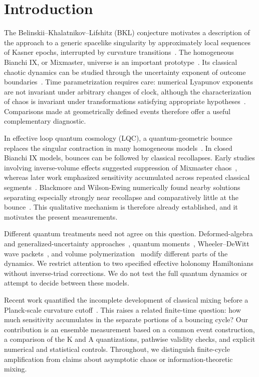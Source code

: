 \documentclass[12pt]{iopjournal}
\begin{document}
\section{Introduction}
The Belinskii--Khalatnikov--Lifshitz (BKL) conjecture motivates a description of the approach to a
generic spacelike singularity by approximately local sequences of Kasner epochs, interrupted by
curvature transitions~\cite{BKL1970}. The homogeneous Bianchi IX, or Mixmaster, universe is an
important prototype~\cite{Misner1969,HeinzleUggla2009,Ringstrom2001,DamourHenneauxNicolai2003}.
Its classical chaotic dynamics can be studied through the uncertainty exponent of outcome
boundaries~\cite{CornishLevin1997}. Time parametrization requires care: numerical Lyapunov exponents
are not invariant under arbitrary changes of clock, although the characterization of chaos is
invariant under transformations satisfying appropriate hypotheses~\cite{Motter2003,MotterSaa2009}.
Comparisons made at geometrically defined events therefore offer a useful complementary diagnostic.

In effective loop quantum cosmology (LQC), a quantum-geometric bounce replaces the singular contraction
in many homogeneous models~\cite{AshtekarWilsonEwing2009,WilsonEwing2010}. In closed Bianchi IX models,
bounces can be followed by classical recollapses. Early studies involving inverse-volume effects
suggested suppression of Mixmaster chaos~\cite{BojowaldDate2004,BojowaldDateHossain2004}, whereas later
work emphasized sensitivity accumulated across repeated classical segments~\cite{WilsonEwing2019}.
Blackmore and Wilson-Ewing numerically found nearby solutions separating especially strongly near
recollapse and comparatively little at the bounce~\cite{BlackmoreWilsonEwing2023}.
This qualitative mechanism is therefore already established, and it motivates the present measurements.

Different quantum treatments need not agree on this question. Deformed-algebra and generalized-uncertainty
approaches~\cite{BarcaGiovannetti2025,SegretoMontani2025}, quantum moments~\cite{Bojowald2024},
Wheeler--DeWitt wave packets~\cite{LoFrancoMontani2026}, and volume polymerization~\cite{MuzammilHusain2025}
modify different parts of the dynamics. We restrict attention to two specified effective holonomy
Hamiltonians without inverse-triad corrections. We do not test the full quantum dynamics or attempt to decide between these models.

Recent work quantified the incomplete development of classical mixing before a Planck-scale
curvature cutoff~\cite{BrizuelaUriaWilsonEwing2026}. This raises a related finite-time question:
how much sensitivity accumulates in the separate portions of a bouncing cycle? Our contribution
is an ensemble measurement based on a common event construction, a comparison of the K and A quantizations,
pathwise validity checks, and explicit numerical and statistical controls. Throughout, we distinguish finite-cycle amplification from claims about asymptotic chaos or information-theoretic mixing.
\end{document}
